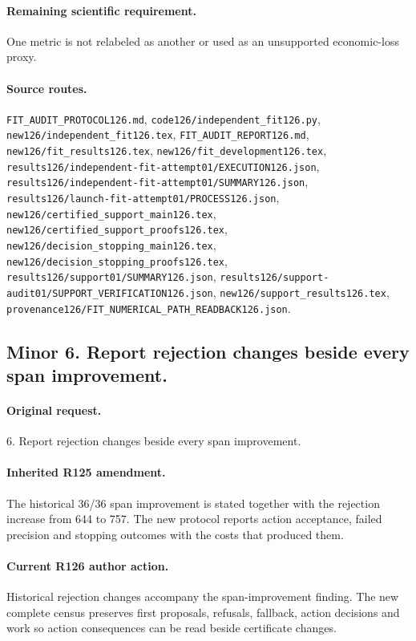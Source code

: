 \paragraph{Remaining scientific requirement.} One metric is not relabeled as another or used as an unsupported economic-loss proxy.

\paragraph{Source routes.} \nolinkurl{FIT_AUDIT_PROTOCOL126.md}, \nolinkurl{code126/independent_fit126.py}, \nolinkurl{new126/independent_fit126.tex}, \nolinkurl{FIT_AUDIT_REPORT126.md}, \nolinkurl{new126/fit_results126.tex}, \nolinkurl{new126/fit_development126.tex}, \nolinkurl{results126/independent-fit-attempt01/EXECUTION126.json}, \nolinkurl{results126/independent-fit-attempt01/SUMMARY126.json}, \nolinkurl{results126/launch-fit-attempt01/PROCESS126.json}, \nolinkurl{new126/certified_support_main126.tex}, \nolinkurl{new126/certified_support_proofs126.tex}, \nolinkurl{new126/decision_stopping_main126.tex}, \nolinkurl{new126/decision_stopping_proofs126.tex}, \nolinkurl{results126/support01/SUMMARY126.json}, \nolinkurl{results126/support-audit01/SUPPORT_VERIFICATION126.json}, \nolinkurl{new126/support_results126.tex}, \nolinkurl{provenance126/FIT_NUMERICAL_PATH_READBACK126.json}.

\subsection*{Minor 6. Report rejection changes beside every span improvement.}
\paragraph{Original request.} 6. Report rejection changes beside every span improvement.

\paragraph{Inherited R125 amendment.} The historical 36/36 span improvement is stated together with the rejection increase from 644 to 757. The new protocol reports action acceptance, failed precision and stopping outcomes with the costs that produced them.

\paragraph{Current R126 author action.} Historical rejection changes accompany the span-improvement finding. The new complete census preserves first proposals, refusals, fallback, action decisions and work so action consequences can be read beside certificate changes.


